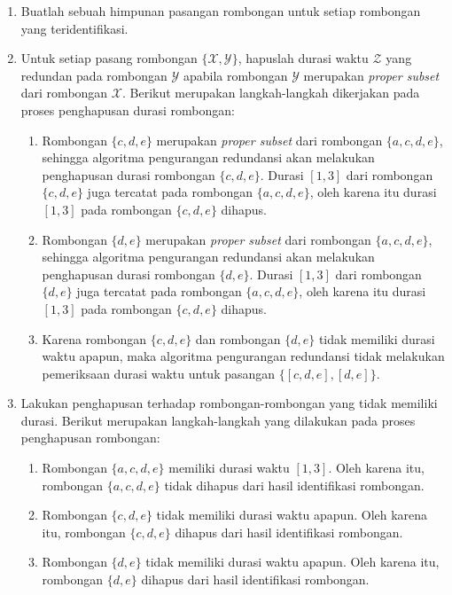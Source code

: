 \begin{enumerate}
    \item Buatlah sebuah himpunan pasangan rombongan untuk setiap rombongan yang teridentifikasi.
    
    \item Untuk setiap pasang rombongan $\{ \mathcal{X}, \mathcal{Y} \}$, hapuslah durasi waktu $\mathcal{Z}$ yang redundan pada rombongan $\mathcal{Y}$ apabila rombongan $\mathcal{Y}$ merupakan \textit{proper subset} dari rombongan $\mathcal{X}$. Berikut merupakan langkah-langkah dikerjakan pada proses penghapusan durasi rombongan:
    
    \begin{enumerate}
        \item Rombongan $\{c, d, e\}$ merupakan \textit{proper subset} dari rombongan $\{a, c, d, e\}$, sehingga algoritma pengurangan redundansi akan melakukan penghapusan durasi rombongan $\{c, d, e\}$. Durasi $[1, 3]$ dari rombongan $\{c, d, e\}$ juga tercatat pada rombongan $\{a, c, d, e\}$, oleh karena itu durasi $[1, 3]$ pada rombongan $\{c, d, e\}$ dihapus.
        \item Rombongan $\{d, e\}$ merupakan \textit{proper subset} dari rombongan $\{a, c, d, e\}$, sehingga algoritma pengurangan redundansi akan melakukan penghapusan durasi rombongan $\{d, e\}$. Durasi $[1, 3]$ dari rombongan $\{d, e\}$ juga tercatat pada rombongan $\{a, c, d, e\}$, oleh karena itu durasi $[1, 3]$ pada rombongan $\{c, d, e\}$ dihapus.
        \item Karena rombongan $\{c, d, e\}$ dan rombongan $\{d, e\}$ tidak memiliki durasi waktu apapun, maka algoritma pengurangan redundansi tidak melakukan pemeriksaan durasi waktu untuk pasangan $\{ [c, d, e], [d, e] \}$.
    \end{enumerate}
    
    \item Lakukan penghapusan terhadap rombongan-rombongan yang tidak memiliki durasi. Berikut merupakan langkah-langkah yang dilakukan pada proses penghapusan rombongan:
    
    \begin{enumerate}
        \item Rombongan $\{a, c, d, e\}$ memiliki durasi waktu $[1, 3]$. Oleh karena itu, rombongan $\{a, c, d, e\}$ tidak dihapus dari hasil identifikasi rombongan.
        \item Rombongan $\{ c, d, e \}$ tidak memiliki durasi waktu apapun. Oleh karena itu, rombongan $\{ c, d, e \}$ dihapus dari hasil identifikasi rombongan.
        \item Rombongan $\{ d, e \}$ tidak memiliki durasi waktu apapun. Oleh karena itu, rombongan $\{ d, e \}$ dihapus dari hasil identifikasi rombongan.
    \end{enumerate}
\end{enumerate}

